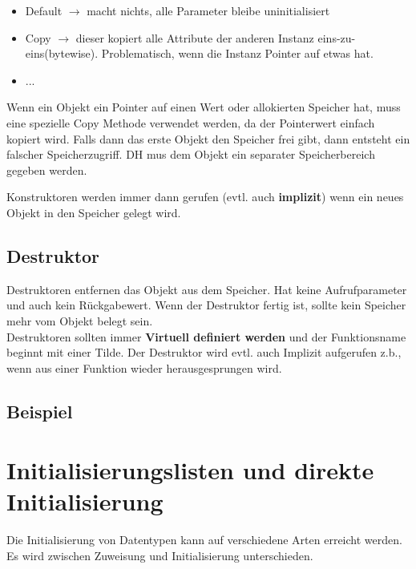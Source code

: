 \begin{itemize}[itemsep=1pt, parsep=0pt]
    \item Default $\rightarrow$ macht nichts, alle Parameter bleibe uninitialisiert
    \item Copy $\rightarrow$ dieser kopiert alle Attribute der anderen Instanz eins-zu-eins(bytewise). Problematisch, wenn die Instanz Pointer auf etwas hat.
    \item ...
\end{itemize}

Wenn ein Objekt ein Pointer auf einen Wert oder allokierten Speicher hat, muss eine spezielle Copy Methode verwendet werden, da der Pointerwert einfach kopiert wird.
Falls dann das erste Objekt den Speicher frei gibt, dann entsteht ein falscher Speicherzugriff.
DH mus dem Objekt ein separater Speicherbereich gegeben werden. 

Konstruktoren werden immer dann gerufen (evtl. auch \textbf{implizit}) wenn ein neues Objekt in den Speicher gelegt wird.\\

\subsection{Destruktor}

Destruktoren entfernen das Objekt aus dem Speicher. 
Hat keine Aufrufparameter und auch kein Rückgabewert.
Wenn der Destruktor fertig ist, sollte kein Speicher mehr vom Objekt belegt sein.\\
Destruktoren sollten immer \textbf{Virtuell definiert werden} und der Funktionsname beginnt mit einer Tilde. 
Der Destruktor wird evtl. auch Implizit aufgerufen z.b., wenn aus einer Funktion wieder herausgesprungen wird. 
\nextcol

\subsection{Beispiel}



\section{Initialisierungslisten und direkte Initialisierung}

Die Initialisierung von Datentypen kann auf verschiedene Arten erreicht werden. 
Es wird zwischen Zuweisung und Initialisierung unterschieden.

